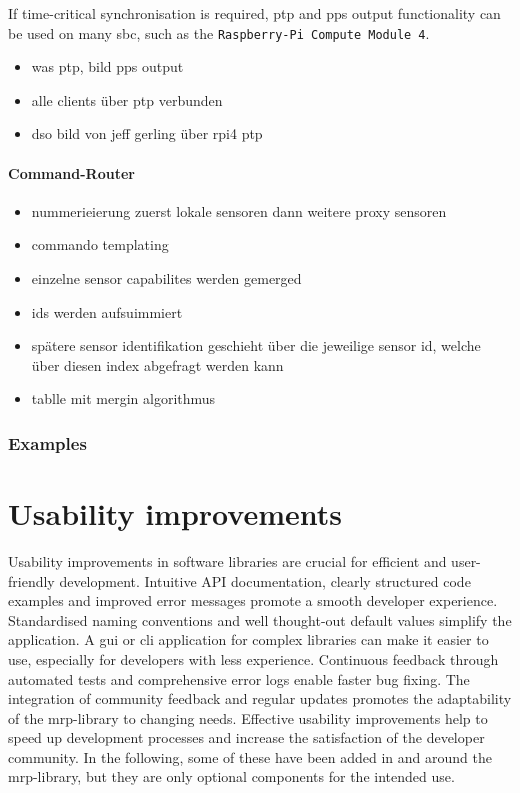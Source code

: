 If time-critical synchronisation is required, \gls{ptp} and \gls{pps}
output functionality can be used on many \gls{sbc}, such as the
\passthrough{\lstinline!Raspberry-Pi Compute Module 4!}.

\begin{itemize}
\tightlist
\item
  was ptp, bild pps output
\item
  alle clients über ptp verbunden
\item
  dso bild von jeff gerling über rpi4 ptp
\end{itemize}

\hypertarget{command-router}{%
\subsubsection{Command-Router}\label{command-router}}

\begin{itemize}
\item
  nummerieierung zuerst lokale sensoren dann weitere proxy sensoren
\item
  commando templating
\item
  einzelne sensor capabilites werden gemerged
\item
  ids werden aufsuimmiert
\item
  spätere sensor identifikation geschieht über die jeweilige sensor id,
  welche über diesen index abgefragt werden kann
\item
  tablle mit mergin algorithmus
\end{itemize}

\hypertarget{examples}{%
\subsection{Examples}\label{examples}}

\hypertarget{usability-improvements}{%
\chapter{Usability improvements}\label{usability-improvements}}

Usability improvements in software libraries are crucial for efficient
and user-friendly development. Intuitive API documentation, clearly
structured code examples and improved error messages promote a smooth
developer experience. Standardised naming conventions and well
thought-out default values simplify the application. A \gls{gui} or
\gls{cli} application for complex libraries can make it easier to use,
especially for developers with less experience. Continuous feedback
through automated tests and comprehensive error logs enable faster bug
fixing. The integration of community feedback and regular updates
promotes the adaptability of the \gls{mrp}-library to changing needs.
Effective usability improvements help to speed up development processes
and increase the satisfaction of the developer community. In the
following, some of these have been added in and around the
\gls{mrp}-library, but they are only optional components for the
intended use.

